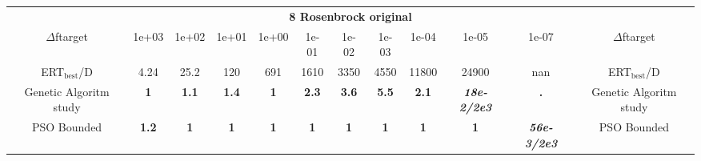 \begin{tabular}{cccccccccccc}
 & \multicolumn{10}{c}{{\normalsize \textbf{8 Rosenbrock original}}}\\
$\Delta$ftarget& 1e+03& 1e+02& 1e+01& 1e+00& 1e-01& 1e-02& 1e-03& 1e-04& 1e-05& 1e-07 & $\Delta$ftarget \\
ERT$_{\textrm{best}}$/D& 4.24& 25.2& 120& 691& 1610& 3350& 4550& 11800& 24900& nan & ERT$_{\textrm{best}}$/D \\
\hline
Genetic Algoritm study & \textbf{1} & \textbf{1.1} & \textbf{1.4} & \textbf{1} & \textbf{2.3} & \textbf{3.6} & \textbf{5.5} & \textbf{2.1} & \textbf{\textit{18e-2}\textit{/2e3}} & \textbf{.} & Genetic Algoritm study \cite{add_an_entry_for_Genetic Algoritm study_in_bbob.bib}\\
PSO Bounded & \textbf{1.2} & \textbf{1} & \textbf{1} & \textbf{1} & \textbf{1} & \textbf{1} & \textbf{1} & \textbf{1} & \textbf{1} & \textbf{\textit{56e-3}\textit{/2e3}} & PSO Bounded \cite{add_an_entry_for_PSO Bounded_in_bbob.bib}
\end{tabular}
